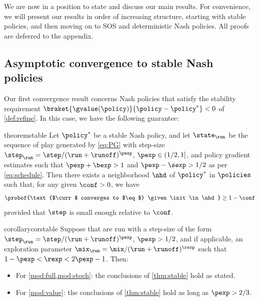 

We are now in a position to state and discuss our main results.
For convenience, we will present our results in order of increasing structure, starting with stable policies, and then moving on to \acl{SOS} and deterministic Nash policies.
All proofs are deferred to the appendix.


\subsection{Asymptotic convergence to stable Nash policies}

Our first convergence result concerns Nash policies that satisfy the stability requirement $\braket{\gvalue(\policy)}{\policy-\eq} < 0$ of \cref{def:refine}.
In this case, we have the following guarantee:

\begin{restatable}{theorem}{stable}
\label{thm:stable}
Let $\eq$ be a stable Nash policy, and let $\curr$ be the sequence of play generated by \eqref{eq:PG} with step-size $\curr[\step] = \step/(\run + \runoff)^{\pexp}$, $\pexp \in (1/2,1]$,
and policy gradient estimates such that $\pexp + \bexp >1$ and $\pexp - \sexp > 1/2$ as per \eqref{eq:schedule}.
Then there exists a neighborhood $\nhd$ of $\eq$ in $\policies$ such that, for any given $\conf>0$, we have
\begin{equation}
\label{eq:primal-local}
\probof{\text{$\curr$ converges to $\eq$} \given \init\in\nhd}
	\geq 1-\conf
\end{equation}
provided that $\step$ is small enough  relative to $\conf$.
\end{restatable}

\begin{restatable}{corollary}{corstable}
\label{cor:stable}
Suppose that  are run with a step-size of the form $\curr[\step] = \step/(\run+\runoff)^{\pexp}$, $\pexp>1/2$, and if applicable,
an exploration parameter $\curr[\mix] = \mix/(\run+\runoff)^{\rexp}$ such that $1-\pexp < \rexp < 2\pexp-1$.
Then:
\begin{itemize}
\item
For \cref{mod:full,mod:stoch}:
the conclusions of \cref{thm:stable} hold as stated.
\item
For \cref{mod:value}:
the conclusions of \cref{thm:stable} hold as long as $\pexp>2/3$.
\end{itemize}
\end{restatable}


